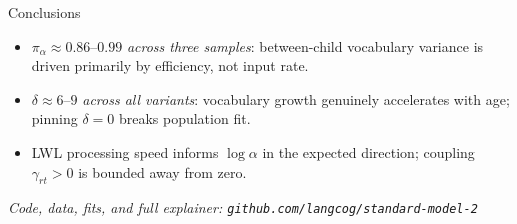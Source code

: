 \documentclass[aspectratio=169,t]{beamer}
\newcommand{\pia}{\pi_{\alpha}}
\begin{document}
\begin{frame}{Conclusions}

\begin{itemize}\setlength\itemsep{0.6em}
\item $\pia \approx 0.86$--$0.99$ \emph{across three samples}:
  between-child vocabulary variance is driven primarily by efficiency,
  not input rate.
\item $\delta \approx 6$--$9$ \emph{across all variants}: vocabulary
  growth genuinely accelerates with age; pinning $\delta = 0$ breaks
  population fit.
\item LWL processing speed informs $\log\alpha$ in the expected
  direction; coupling $\gamma_{rt} > 0$ is bounded away from zero.
\end{itemize}

\vspace{1em}
\small\textit{Code, data, fits, and full explainer:
\texttt{github.com/langcog/standard-model-2}}

\end{frame}
\end{document}
